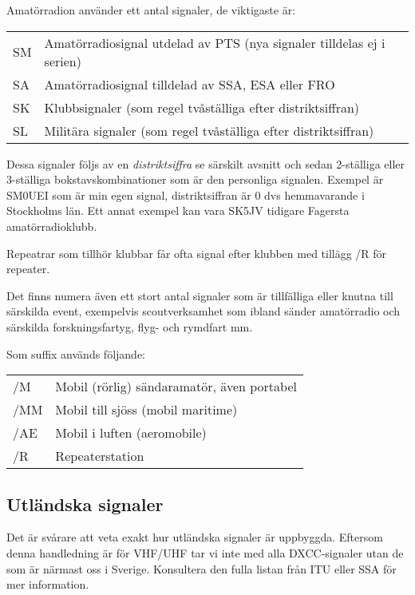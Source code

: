\documentclass[10pt,swedish,a4paper,twoside]{article}
\begin{document}
Amatörradion använder ett antal signaler, de viktigaste är:

\begin{tabular}{ll}
	SM & Amatörradiosignal utdelad av PTS (nya signaler tilldelas ej i serien) \\
	SA & Amatörradiosignal tilldelad av SSA, ESA eller FRO                     \\
	SK & Klubbsignaler (som regel tvåställiga efter distriktsiffran)           \\
	SL & Militära signaler (som regel tvåställiga efter distriktsiffran)
\end{tabular}

Dessa signaler följs av en \textit{distriktsiffra} se särskilt avsnitt och sedan 2-ställiga eller 3-ställiga bokstavskombinationer som är den personliga signalen. Exempel är SM0UEI som är min egen signal, distriktsiffran är 0 dvs hemmavarande i Stockholms län. Ett annat exempel kan vara SK5JV tidigare Fagersta amatörradioklubb.

Repeatrar som tillhör klubbar får ofta signal efter klubben med tillägg /R för repeater.

Det finns numera även ett stort antal signaler som är tillfälliga eller knutna till särskilda event, exempelvis scoutverksamhet som ibland sänder amatörradio och särskilda forskningsfartyg, flyg- och rymdfart mm.

Som suffix används följande:

\begin{tabular}{ll}
	/M  & Mobil (rörlig) sändaramatör, även portabel \\
	/MM & Mobil till sjöss (mobil maritime)          \\
	/AE & Mobil i luften (aeromobile)                \\
	/R  & Repeaterstation
\end{tabular}

\subsection{Utländska signaler}

Det är svårare att veta exakt hur utländska signaler är uppbyggda. Eftersom denna handledning är för VHF/UHF tar vi inte med alla DXCC-signaler utan de som är närmast oss i Sverige. Konsultera den fulla listan från ITU eller SSA för mer information.
\end{document}
